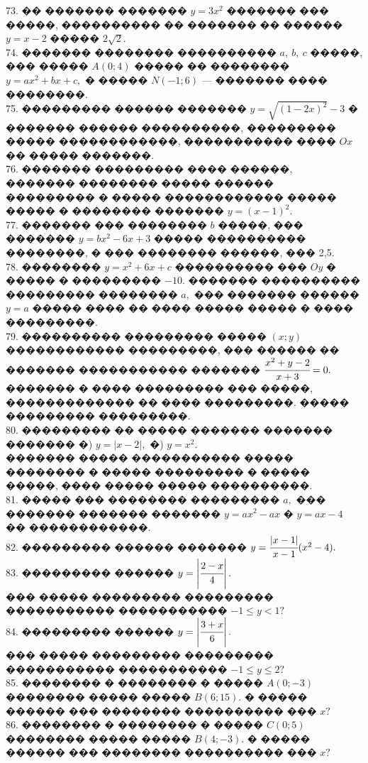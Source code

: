\documentclass[12pt]{article}
\begin{document}
73. �� ������� ������� $y=3x^2$ ������� ��� �����, ���������� �� ������� �� ������ $y=x-2$ ����� $2\sqrt{2}.$\\
74. ������� �������� ���������� $a,\ b,\ c$ �����, ��� ����� $A(0;4)$ ����� �� �������� $y=ax^2+bx+c,$ � ����� $N(-1;6)$ --- ������� ���� ��������.\\
75. ��������� ������ ������� $y=\sqrt{(1-2x)^2}-3$ � ������� ������ ����������, ��������� ����� ������������, ����������� ���� $Ox$ �� ����� �������.\\
76. ������� ��������� ���� ������, ������� �������� ����� ������ ��������� � ����� ������������ ����� ����� � �������� ������� $y=(x-1)^2.$\\
77. ������� ��� �������� $b$ �����, ��� ������� $y=bx^2-6x+3$ ����� ���������� ��������, � ��� �������� ������, ��� 2,5.\\
78. �������� $y=x^2+6x+c$ ���������� ��� $Oy$ � ����� � ��������� $-10.$ ������� ���������� ��������� �������� $a,$ ��� ������� ������ $y=a$ ����� ���� �� ���� ����� ����� � ���� ���������.\\
79. ���������� ��������� ����� $(x;y)$ ������������ ���������, ��� ������ �� ������� ����������� ������� $\cfrac{x^2+y-2}{x+3}=0.$ ������� � ���� ��������� ��� �����, ������������� �� ���� ���������. ����� ��������� ���������.\\
80. ��������� �� ����� ������� ������� ������� �) $y=|x-2|,$ �) $y=x^2.$\\
������� ����� ����������� ����� �������� � ����� ��������� � ����� �����, ���� ����� ����� ����������.\\
81. ����� ��� �������� ��������� $a,$ ��� ������� ������� ������� $y=ax^2-ax$ � $y=ax-4$ �� ������������.\\
82. ��������� ������ ������� $y=\cfrac{|x-1|}{x-1}(x^2-4).$\\
83. ��������� ������ $y=\left|\cfrac{2-x}{4}\right|.$\\
��� ����� ��������� ��������� ����������� ����������� $-1\leqslant y<1?$\\
84. ��������� ������ $y=\left|\cfrac{3+x}{6}\right|.$\\
��� ����� ��������� ��������� ����������� ����������� $-1\leqslant y\leqslant2?$\\
85. �������� � �������� � ����� $A(0;-3)$ �������� ����� ����� $B(6;15).$ � ����� ������ ��� �������� ���������� ��� $x?$\\
86. �������� � �������� � ����� $C(0;5)$ �������� ����� ����� $B(4;-3).$ � ����� ������ ��� �������� ���������� ��� $x?$\\
\end{document}
